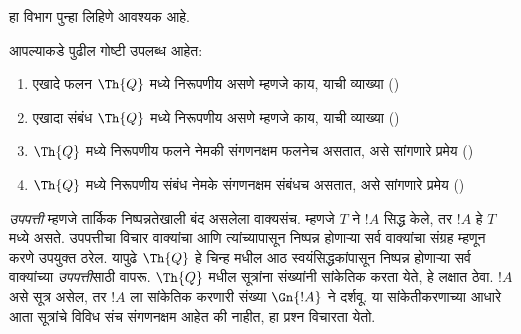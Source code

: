 \documentclass[../../../include/open-logic-section]{subfiles}
\begin{document}


\begin{editorial}
हा विभाग पुन्हा लिहिणे आवश्यक आहे.
\end{editorial}

आपल्याकडे पुढील गोष्टी उपलब्ध आहेत:
\begin{enumerate}
\item एखादे फलन $\Th{Q}$ मध्ये निरूपणीय असणे म्हणजे काय,
  याची व्याख्या ()
\item एखादा संबंध $\Th{Q}$ मध्ये निरूपणीय असणे म्हणजे काय,
  याची व्याख्या ()
\item $\Th{Q}$ मध्ये निरूपणीय फलने नेमकी संगणनक्षम
  फलनेच असतात, असे सांगणारे प्रमेय
  ()
\item $\Th{Q}$ मध्ये निरूपणीय संबंध नेमके संगणनक्षम
  संबंधच असतात, असे सांगणारे प्रमेय
  ()
\end{enumerate}

{ \em उपपत्ती} म्हणजे तार्किक निष्पन्नतेखाली बंद असलेला वाक्यसंच.
म्हणजे $T$ ने $!A$ सिद्ध केले, तर $!A$ हे $T$ मध्ये
असते. उपपत्तीचा विचार वाक्यांचा आणि त्यांच्यापासून
निष्पन्न होणाऱ्या सर्व वाक्यांचा संग्रह म्हणून करणे
उपयुक्त ठरेल. यापुढे $\Th{Q}$ हे चिन्ह
 मधील आठ स्वयंसिद्धकांपासून
निष्पन्न होणाऱ्या सर्व वाक्यांच्या { \em उपपत्ती}साठी
वापरू. $\Th{Q}$ मधील सूत्रांना संख्यांनी
सांकेतिक करता येते, हे लक्षात ठेवा. $!A$ असे
सूत्र असेल, तर $!A$ ला सांकेतिक करणारी
संख्या $\Gn{!A}$ ने दर्शवू. या सांकेतीकरणाच्या
आधारे आता सूत्रांचे विविध संच संगणनक्षम आहेत की
नाहीत, हा प्रश्न विचारता येतो.
\end{document}
